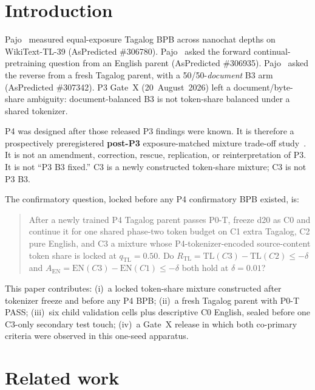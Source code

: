 \documentclass[11pt,a4paper]{article}
\begin{document}
\section{Introduction}
\label{sec:intro}

Pajo~\cite{pajo2026p11} measured equal-exposure Tagalog BPB across nanochat depths on WikiText-TL-39 (AsPredicted \#306780). Pajo~\cite{pajo2026p2} asked the forward continual-pretraining question from an English parent (AsPredicted \#306935). Pajo~\cite{pajo2026p3} asked the reverse from a fresh Tagalog parent, with a 50/50-\emph{document} B3 arm (AsPredicted \#307342). P3 Gate~X (20~August~2026) left a document/byte-share ambiguity: document-balanced B3 is not token-share balanced under a shared tokenizer.

P4 was designed after those released P3 findings were known. It is therefore a prospectively preregistered \textbf{post-P3} exposure-matched mixture trade-off study~\cite{aspredicted307591}. It is not an amendment, correction, rescue, replication, or reinterpretation of P3. It is not ``P3 B3 fixed.'' C3 is a newly constructed token-share mixture; C3 is not P3 B3.

The confirmatory question, locked before any P4 confirmatory BPB existed, is:

\begin{quote}
After a newly trained P4 Tagalog parent passes P0-T, freeze d20 as C0 and continue it for one shared phase-two token budget on C1 extra Tagalog, C2 pure English, and C3 a mixture whose P4-tokenizer-encoded source-content token share is locked at $q_{\mathrm{TL}}=0.50$. Do $R_{\mathrm{TL}}=\mathrm{TL}(C3)-\mathrm{TL}(C2)\le -\delta$ and $A_{\mathrm{EN}}=\mathrm{EN}(C3)-\mathrm{EN}(C1)\le -\delta$ both hold at $\delta=0.01$?
\end{quote}

This paper contributes: (i)~a locked token-share mixture constructed after tokenizer freeze and before any P4 BPB; (ii)~a fresh Tagalog parent with P0-T PASS; (iii)~six child validation cells plus descriptive C0 English, sealed before one C3-only secondary test touch; (iv)~a Gate~X release in which both co-primary criteria were observed in this one-seed apparatus.

\section{Related work}
\label{sec:related}
\end{document}
